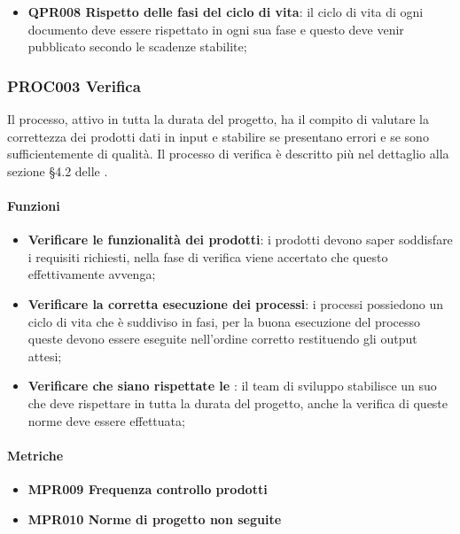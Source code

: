 		\begin{itemize}
			\item \textbf{QPR008 Rispetto delle fasi del ciclo di vita}: il ciclo di vita di ogni documento deve essere rispettato in ogni sua fase e questo deve venir pubblicato secondo le scadenze stabilite; 
		\end{itemize}
	
	\subsubsection{PROC003 Verifica}
	Il processo, attivo in tutta la durata del progetto, ha il compito di valutare la correttezza dei prodotti dati in input e stabilire se presentano errori e se sono sufficientemente di qualità. Il processo di verifica è descritto più nel dettaglio alla sezione §4.2 delle \Doc{\NdP}.
	
		\paragraph*{Funzioni}
		
		\begin{itemize}
			\item \textbf{Verificare le funzionalità dei prodotti}: i prodotti devono saper soddisfare i requisiti richiesti, nella fase di verifica viene accertato che questo effettivamente avvenga;
			\item \textbf{Verificare la corretta esecuzione dei processi}: i processi possiedono un ciclo di vita che è suddiviso in fasi, per la buona esecuzione del processo queste devono essere eseguite nell'ordine corretto restituendo gli output attesi; 
			\item \textbf{Verificare che siano rispettate le \NdP}: il team di sviluppo stabilisce un suo  che deve rispettare in tutta la durata del progetto, anche la verifica di queste norme deve essere effettuata;
		\end{itemize}
		
		\paragraph*{Metriche}
		
		\begin{itemize}
			\item \textbf{MPR009 Frequenza controllo prodotti}
			\item \textbf{MPR010 Norme di progetto non seguite}
		\end{itemize}
		

